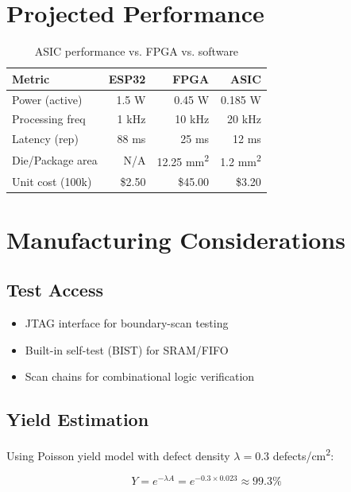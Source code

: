 \section{Projected Performance}

\begin{table}[h]
    \centering
    \caption{ASIC performance vs. FPGA vs. software}
    \label{tab:asic_perf}
    \begin{tabular}{lrrr}
        \toprule
        \textbf{Metric} & \textbf{ESP32} & \textbf{FPGA} & \textbf{ASIC} \\
        \midrule
        Power (active) & 1.5 W & 0.45 W & 0.185 W \\
        Processing freq & 1 kHz & 10 kHz & 20 kHz \\
        Latency (rep) & 88 ms & 25 ms & 12 ms \\
        Die/Package area & N/A & 12.25 mm\textsuperscript{2} & 1.2 mm\textsuperscript{2} \\
        Unit cost (100k) & \$2.50 & \$45.00 & \$3.20 \\
        \bottomrule
    \end{tabular}
\end{table}

\section{Manufacturing Considerations}

\subsection{Test Access}

\begin{itemize}
    \item JTAG interface for boundary-scan testing
    \item Built-in self-test (BIST) for SRAM/FIFO
    \item Scan chains for combinational logic verification
\end{itemize}

\subsection{Yield Estimation}

Using Poisson yield model with defect density $\lambda = 0.3$ defects/cm\textsuperscript{2}:

\begin{equation}
    Y = e^{-\lambda A} = e^{-0.3 \times 0.023} \approx 99.3\%
\end{equation}

